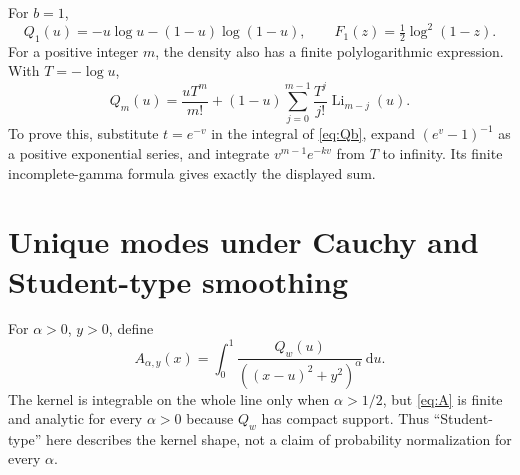 \documentclass[11pt]{article}
\numberwithin{equation}{section}
\theoremstyle{definition}
\theoremstyle{remark}
\DeclareMathOperator{\Li}{Li}
\newcommand{\dd}{\,\mathrm d}
\newcommand{\Qw}{Q_w}
\begin{document}
For $b=1$,
\begin{equation}\label{eq:entropy}
 Q_1(u)=-u\log u-(1-u)\log(1-u),\qquad
 F_1(z)=\tfrac12\log^2(1-z).
\end{equation}
For a positive integer $m$, the density also has a finite polylogarithmic
expression. With $T=-\log u$,
\begin{equation}\label{eq:Qinteger}
 Q_m(u)=\frac{uT^m}{m!}
 +(1-u)\sum_{j=0}^{m-1}\frac{T^j}{j!}\Li_{m-j}(u).
\end{equation}
To prove this, substitute $t=e^{-v}$ in the integral of \eqref{eq:Qb},
expand $(e^v-1)^{-1}$ as a positive exponential series, and integrate
$v^{m-1}e^{-kv}$ from $T$ to infinity. Its finite incomplete-gamma
formula gives exactly the displayed sum.

\section{Unique modes under Cauchy and Student-type smoothing}
\label{sec:modes}
For $\alpha>0$, $y>0$, define
\begin{equation}\label{eq:A}
 A_{\alpha,y}(x)=\int_0^1
        \frac{\Qw(u)}{((x-u)^2+y^2)^\alpha}\dd u.
\end{equation}
The kernel is integrable on the whole line only when $\alpha>1/2$,
but \eqref{eq:A} is finite and analytic for every $\alpha>0$ because
$\Qw$ has compact support. Thus ``Student-type'' here describes the
kernel shape, not a claim of probability normalization for every
$\alpha$.
\end{document}
